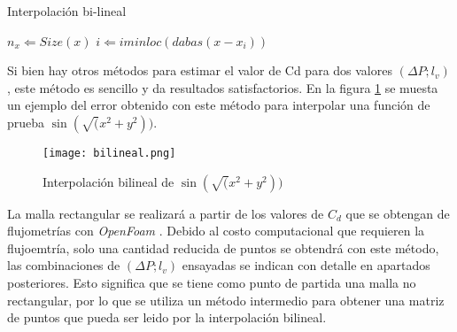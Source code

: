 \begin{algorithm}
 \caption{Interpolación bi-lineal}
 \label{algo:bilineal}
    \SetAlgoLined

    $n_x \Leftarrow Size(x)$\;
    $i \Leftarrow iminloc(dabas(x-x_i))$\;

\end{algorithm}

Si bien hay otros métodos para estimar el valor de Cd para dos valores $(\Delta
P; l_v)$, este método es sencillo y da resultados satisfactorios.
%
En la figura \ref{fig:bilineal} se muesta un ejemplo del error obtenido
con este método para interpolar una función de prueba 
$\sin(\sqrt(x^2 + y^2))$.

\begin{figure}
    \centering
    \texttt{[image: bilineal.png]}
    \caption{Interpolación bilineal de $\sin(\sqrt(x^2 + y^2))$}
    \label{fig:bilineal}
\end{figure}

La malla rectangular se realizará a partir de los valores de $C_d$ que se
obtengan de flujometrías con \emph{OpenFoam} \cite{openfoam}.
%
Debido al costo computacional que requieren la flujoemtría, solo una cantidad
reducida de puntos se obtendrá con este método, las combinaciones de $(\Delta
P; l_v)$ ensayadas se indican con detalle en apartados posteriores.
%
Esto significa que se tiene como punto de partida una malla no rectangular, por
lo que se utiliza un método intermedio para obtener una matriz de puntos que
pueda ser leido por la interpolación bilineal.

